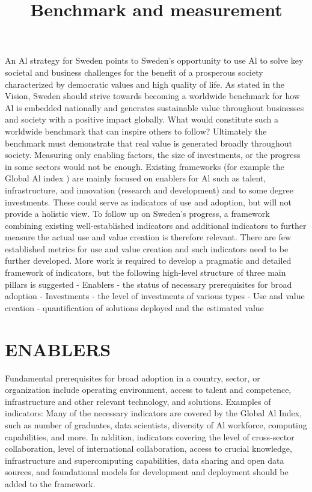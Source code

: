 \title{
Benchmark and measurement
}
An Al strategy for Sweden points to Sweden's opportunity to use Al to solve key societal and business challenges for the benefit of a prosperous society characterized by democratic values and high quality of life.
As stated in the Vision, Sweden should strive towards becoming a worldwide benchmark for how Al is embedded nationally and generates sustainable value throughout businesses and society with a positive impact globally. What would constitute such a worldwide benchmark that can inspire others to follow?
Ultimately the benchmark must demonstrate that real value is generated broadly throughout society. Measuring only enabling factors, the size of investments, or the progress in some sectors would not be enough.
Existing frameworks (for example the Global Al index ) are mainly focused on enablers for Al such as talent, infrastructure, and innovation (research and development) and to some degree investments. These could serve as indicators of use and adoption, but will not provide a holistic view.
To follow up on Sweden's progress, a framework combining existing well-established indicators and additional indicators to further measure the actual use and value creation is therefore relevant. There are few established metrics for use and value creation and such indicators need to be further developed.
More work is required to develop a pragmatic and detailed framework of indicators, but the following high-level structure of three main pillars is suggested
- Enablers - the status of necessary prerequisites for broad adoption
- Investments - the level of investments of various types
- Use and value creation - quantification of solutions deployed and the estimated value
\section*{ENABLERS}
Fundamental prerequisites for broad adoption in a country, sector, or organization include operating environment, access to talent and competence, infrastructure and other relevant technology, and solutions.
Examples of indicators:
Many of the necessary indicators are covered by the Global Al Index, such as number of graduates, data scientists, diversity of Al workforce, computing capabilities, and more.
In addition, indicators covering the level of cross-sector collaboration, level of international collaboration, access to crucial knowledge, infrastructure and supercomputing capabilities, data sharing and open data sources, and foundational models for development and deployment should be added to the framework.

